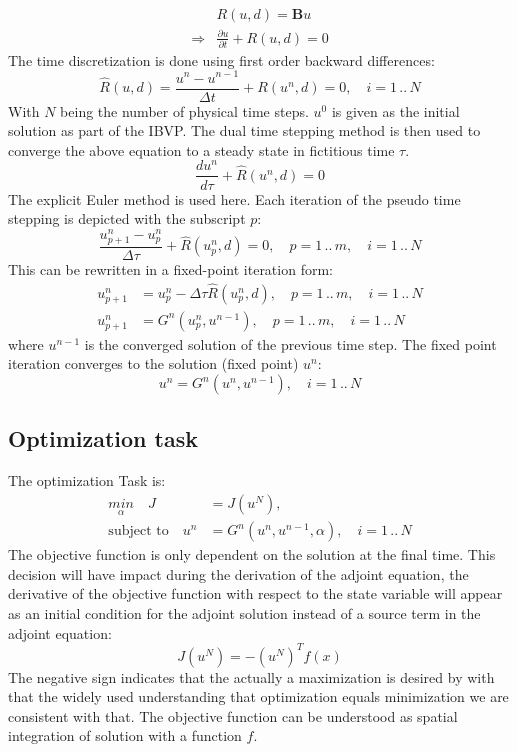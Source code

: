 \documentclass[10pt]{article}
\begin{document}
\begin{align}
&R(u,d) = \mathbf{B}u  \\
\Rightarrow & \frac{\partial u}{\partial t} + R(u,d) = 0
\end{align}
The time discretization is done using first order backward differences:
\begin{equation}
\hat R (u,d) = \frac{u^{n} - u^{n-1}}{\Delta t} + R(u^n,d) = 0,\quad i= 1\,..\,N
\end{equation}
With $N$ being the number of physical time steps. $u^0$ is given as the initial solution as part of the IBVP. The dual time stepping method is then used to converge the above equation to a steady state in fictitious time $\tau$. 
\begin{equation}
\frac{d u^n}{d\tau} + \hat R(u^{n},d) = 0
\end{equation} 
The explicit Euler method is used here. Each iteration of the pseudo time stepping is depicted with the subscript $p$:
\begin{equation}
\frac{u^n_{p+1}-u^n_{p}}{\Delta\tau} + \hat R(u^{n}_{p},d) = 0,\quad p= 1\,..\,m,\quad i= 1\,..\,N
\end{equation} 
This can be rewritten in a fixed-point iteration form:
\begin{align}
u^n_{p+1} &= u^n_{p} - \Delta\tau\hat R(u^{n}_{p},d),\quad p= 1\,..\,m,\quad i= 1\,..\,N\\
u^n_{p+1} &= G^n \left( u^n_p, u^{n-1} \right),\quad p= 1\,..\,m,\quad i= 1\,..\,N
\end{align}
where $u^{n-1}$ is the converged solution of the previous time step. The fixed point iteration converges to the solution (fixed point) $u^n$:
\begin{equation}
u^n = G^n\left( u^n, u^{n-1} \right),\quad i= 1\,..\,N
\end{equation}
\subsection{Optimization task}
The optimization Task is:
\begin{align}
\underset{\alpha}{min}\quad J &= J(u^N), \\
\text{subject to}\quad u^n &= G^n \left( u^n, u^{n-1}, \alpha \right),\quad i= 1\,..\,N
\end{align}
The objective function is only dependent on the solution at the final time. This decision will have impact during the derivation of the adjoint equation, the derivative of the objective function with respect to the state variable will appear as an initial condition for the adjoint solution instead of a source term in the adjoint equation:
\begin{equation}
J(u^N) = -(u^N)^T f(x)
\end{equation}
The negative sign indicates that the actually a maximization is desired by with that the widely used understanding that optimization equals minimization we are consistent with that. 
The objective function can be understood as spatial integration of solution with a function $f$.
\end{document}
